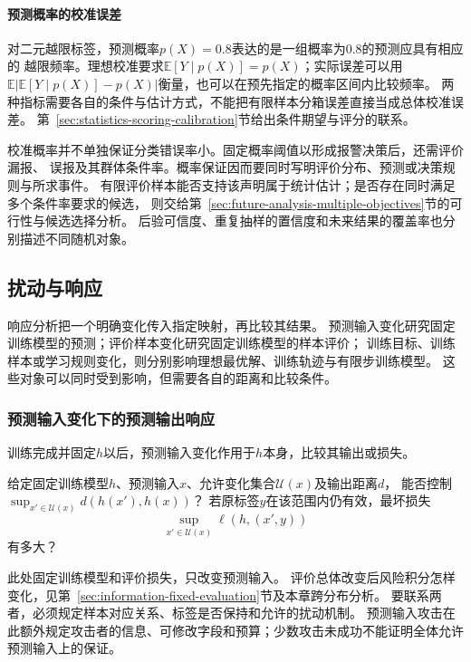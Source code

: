 \paragraph{预测概率的校准误差}

对二元越限标签，预测概率$p(X)=0.8$表达的是一组概率为$0.8$的预测应具有相应的
越限频率。理想校准要求$\mathbb E[Y\mid p(X)]=p(X)$；实际误差可以用
$\mathbb E|\mathbb E[Y\mid p(X)]-p(X)|$衡量，也可以在预先指定的概率区间内比较频率。
两种指标需要各自的条件与估计方式，不能把有限样本分箱误差直接当成总体校准误差。
第~\ref{sec:statistics-scoring-calibration}节给出条件期望与评分的联系。

校准概率并不单独保证分类错误率小。固定概率阈值以形成报警决策后，还需评价漏报、
误报及其群体条件率。概率保证因而要同时写明评价分布、预测或决策规则与所求事件。
有限评价样本能否支持该声明属于统计估计；是否存在同时满足多个条件率要求的候选，
则交给第~\ref{sec:future-analysis-multiple-objectives}节的可行性与候选选择分析。
后验可信度、重复抽样的置信度和未来结果的覆盖率也分别描述不同随机对象。

\subsection{扰动与响应}
\label{sec:future-robustness-security-map}
\label{sec:future-privacy-unlearning-map}

响应分析把一个明确变化传入指定映射，再比较其结果。
预测输入变化研究固定训练模型的预测；评价样本变化研究固定训练模型的样本评价；
训练目标、训练样本或学习规则变化，则分别影响理想最优解、训练轨迹与有限步训练模型。
这些对象可以同时受到影响，但需要各自的距离和比较条件。

\subsubsection{预测输入变化下的预测输出响应}
\label{sec:future-analysis-robustness}

训练完成并固定$h$以后，预测输入变化作用于$h$本身，比较其输出或损失。

\begin{mathproblem}[预测输入扰动的输出与损失响应]
  \label{question:future-robustness}
  给定固定训练模型$h$、预测输入$x$、允许变化集合$\mathcal U(x)$及输出距离$d$，
  能否控制$\sup_{x'\in\mathcal U(x)}d(h(x'),h(x))$？
  若原标签$y$在该范围内仍有效，最坏损失
  \[
    \sup_{x'\in\mathcal U(x)}\ell(h,(x',y))
  \]
  有多大？
\end{mathproblem}

此处固定训练模型和评价损失，只改变预测输入。
评价总体改变后风险积分怎样变化，见第~\ref{sec:information-fixed-evaluation}节及本章跨分布分析。
要联系两者，必须规定样本对应关系、标签是否保持和允许的扰动机制。
预测输入攻击在此额外规定攻击者的信息、可修改字段和预算；少数攻击未成功不能证明全体允许预测输入上的保证。

